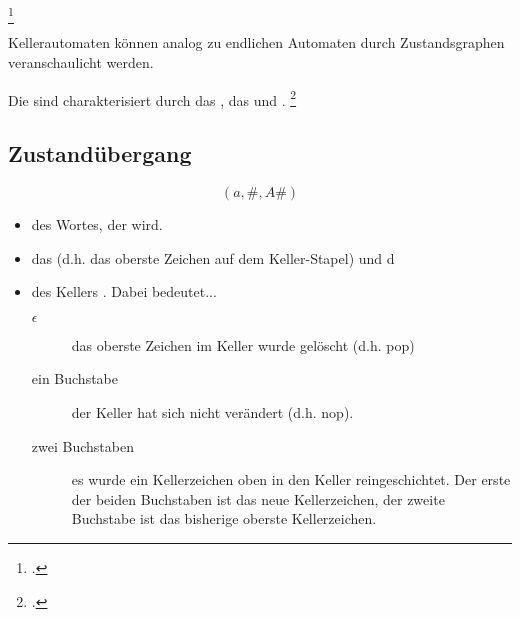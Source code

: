 \documentclass{lehramt-informatik-haupt}
\begin{document}
\footcite[Seite 224]{hoffmann}

Kellerautomaten können analog zu endlichen Automaten durch
Zustandsgraphen veranschaulicht werden.

Die  sind charakterisiert durch das
, das  und
.
\footcite[Seite 23]{theo:fs:2}

\subsection{Zustandübergang}

\begin{displaymath}
(a, \#, A\#)
\end{displaymath}

\begin{itemize}
\item

 des Wortes, der  wird.

\item

das  (d.h. das oberste
Zeichen auf dem Keller-Stapel) und d

\item

 des Kellers . Dabei bedeutet...

\begin{description}
\item[$\epsilon$]

das oberste Zeichen im Keller wurde gelöscht (d.h. pop)

\item[ein Buchstabe]

der Keller hat sich nicht verändert (d.h. nop).

\item[zwei Buchstaben]

es wurde ein Kellerzeichen oben in den Keller reingeschichtet. Der erste
der beiden Buchstaben ist das neue Kellerzeichen, der zweite Buchstabe
ist das bisherige oberste Kellerzeichen.
\end{description}
\end{itemize}

\literatur
\end{document}
